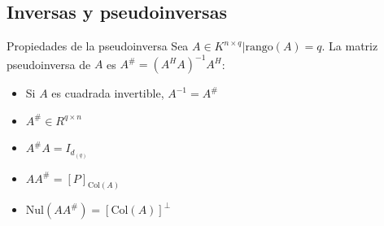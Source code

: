 \documentclass[a4paper, twoside]{article}
\numberwithin{equation}{section}
\numberwithin{figure}{section}
\numberwithin{table}{section}
\newcommand{\col}[1]{\text{Col}(#1)}
\newcommand{\nul}[1]{\text{Nul}(#1)}
\newcommand{\rg}[1]{\text{rango}\left(#1\right)}
\begin{document}
\subsection{Inversas y pseudoinversas}
\begin{definicion*}{Propiedades de la pseudoinversa}
	Sea $A \in K^{n \times q} \vert \rg{A} = q$. La matriz pseudoinversa de $A$ es $A^{\#} = \left( A^H A \right)^{-1} A^H$:
	\begin{itemize}
		\item Si $A$ es cuadrada invertible, $A^{-1} = A^{\#}$
		\item $A^{\#} \in R^{q \times n}$
		\item $A^{\#}A = I_{d_{(q)}}$
		\item $A A^{\#} = [P]_{\col{A}}$
		\item $\nul{A A^{\#}} = [\col{A}]^\bot$ 
	\end{itemize}
\end{definicion*}
\end{document}

